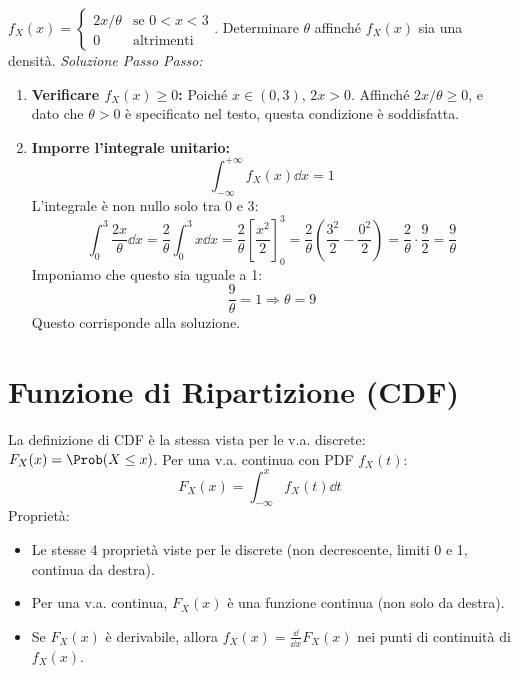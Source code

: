 \begin{example}
$f_X(x) = \begin{cases} 2x/\theta & \text{se } 0 < x < 3 \\ 0 & \text{altrimenti} \end{cases}$. Determinare $\theta$ affinché $f_X(x)$ sia una densità.
\textit{Soluzione Passo Passo:}
\begin{enumerate}
    \item \textbf{Verificare $f_X(x) \ge 0$:}
    Poiché $x \in (0,3)$, $2x > 0$. Affinché $2x/\theta \ge 0$, e dato che $\theta>0$ è specificato nel testo, questa condizione è soddisfatta.
    \item \textbf{Imporre l'integrale unitario:}
    \[ \int_{-\infty}^{+\infty} f_X(x) \dd x = 1 \]
    L'integrale è non nullo solo tra 0 e 3:
    \[ \int_0^3 \frac{2x}{\theta} \dd x = \frac{2}{\theta} \int_0^3 x \dd x = \frac{2}{\theta} \left[ \frac{x^2}{2} \right]_0^3 = \frac{2}{\theta} \left( \frac{3^2}{2} - \frac{0^2}{2} \right) = \frac{2}{\theta} \cdot \frac{9}{2} = \frac{9}{\theta} \]
    Imponiamo che questo sia uguale a 1:
    \[ \frac{9}{\theta} = 1 \Rightarrow \theta = 9 \]
    Questo corrisponde alla soluzione.
\end{enumerate}
\end{example}

\section{Funzione di Ripartizione (CDF)}
La definizione di CDF è la stessa vista per le v.a. discrete: $F_X(x) = \Prob(X \le x)$.
Per una v.a. continua con PDF $f_X(t)$:
\[ F_X(x) = \int_{-\infty}^x f_X(t) \dd t \]
Proprietà:
\begin{itemize}
    \item Le stesse 4 proprietà viste per le discrete (non decrescente, limiti 0 e 1, continua da destra).
    \item Per una v.a. continua, $F_X(x)$ è una funzione continua (non solo da destra).
    \item Se $F_X(x)$ è derivabile, allora $f_X(x) = \frac{\dd}{\dd x} F_X(x)$ nei punti di continuità di $f_X(x)$.
\end{itemize}


